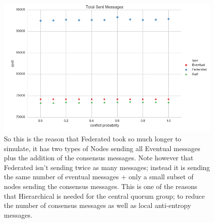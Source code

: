\documentclass[11pt,letterpaper]{article}
\begin{document}
\begin{figure}[!h]
    \centering
        \includegraphics[width=\textwidth]{figures/messages_sent.png}
        \caption{\textsf{So this is the reason that Federated took so much longer to simulate, it has two types of Nodes sending all Eventual messages plus the addition of the consensus messages. Note however that Federated isn't sending twice as many messages; instead it is sending the same number of eventual messages + only a small subset of nodes sending the consensus messages. This is one of the reasons that Hierarchical is needed for the central quorum group; to reduce the number of consensus messages as well as local anti-entropy messages.}}
        \label{fig:messages_sent}
\end{figure}
\end{document}
